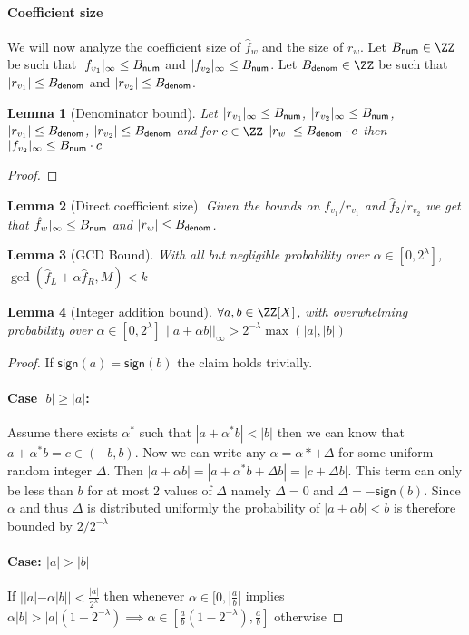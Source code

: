 \documentclass{article}
\theoremstyle{Definition}
\newtheorem{lemma}{Lemma}
\begin{document}
 

\paragraph{Coefficient size}
We will now analyze the coefficient size of $\hat{f}_w$ and the size of $r_w$. Let $\BoundNum\in \ZZ$ be such that $|f_{v_1}|_\infty \leq B_{\textsf{num}}$ and  $|f_{v_2}|_\infty \leq B_{\textsf{num}}$. Let $\BoundDenom\in \ZZ$ be such that $|r_{v_1}|\leq B_{\textsf{denom}}$ and $|r_{v_2}|\leq B_{\textsf{denom}}$. 
\begin{lemma}[Denominator bound]
	Let $|r_{v_1}|_\infty \leq B_{\textsf{num}}$, $|r_{v_2}|_\infty \leq B_{\textsf{num}}$, $|r_{v_1}| \leq B_{\textsf{denom}}$, $|r_{v_2}| \leq B_{\textsf{denom}}$ and for $c\in \ZZ$ $|r_{w}|\leq B_{\textsf{denom}} \cdot c$ then $|f_{v_2}|_\infty \leq B_{\textsf{num}} \cdot c$
\end{lemma}
\begin{proof}

\end{proof}

\begin{lemma}[Direct coefficient size]
Given the bounds on $f_{v_1}/r_{v_1}$ and $\hat{f}_2/r_{v_2}$ we get that $\hat{f}_{w}|_\infty \leq B_{\textsf{num}}$ and  $|r_w| \leq B_{\textsf{denom}}$. 
\end{lemma}
\begin{lemma}[GCD Bound]
	With all but negligible probability over $\alpha \in [0,2^\lambda]$, $\gcd(\hat{f}_L+ \alpha \hat{f}_R,M)<k$
\end{lemma}
\begin{lemma}[Integer addition bound]
$\forall a,b \in \ZZ[X]$, with overwhelming probability over $\alpha \in [0,2^\lambda]$ $||a+\alpha b||_\infty >2^{-\lambda} \max(|a|,|b|)$
\end{lemma}
\begin{proof}
If $\textsf{sign}(a)=\textsf{sign}(b)$ the claim holds trivially. 
\paragraph{Case $|b|\geq|a|$:}
Assume there exists $\alpha^*$ such that $|a+\alpha^* b|<|b|$ then we can know that $a+\alpha^* b=c \in (-b,b)$. Now we can write any $\alpha=\alpha*+\Delta$ for some uniform random integer $\Delta$. Then $|a+\alpha b|=|a+\alpha^* b + \Delta b|=|c+\Delta b|$. This term can only be less than $b$ for at most 2 values of $\Delta$ namely $\Delta=0$ and $\Delta=-\textsf{sign}(b)$. Since $\alpha$ and thus $\Delta$ is distributed uniformly the probability of $|a+\alpha b|<b$ is therefore bounded by $2/2^{-\lambda}$

\paragraph{Case: $|a|> |b|$}
If $||a|-\alpha |b|| <\frac{|a|}{2^\lambda}$ then whenever $\alpha \in [0,|\frac{a}{b}|$ implies $\alpha |b|>|a|(1-2^{-\lambda}) \implies \alpha \in [\frac{a}{b}(1-2^{-\lambda}),\frac{a}{b}]$ otherwise 
\end{proof}
\end{document}

